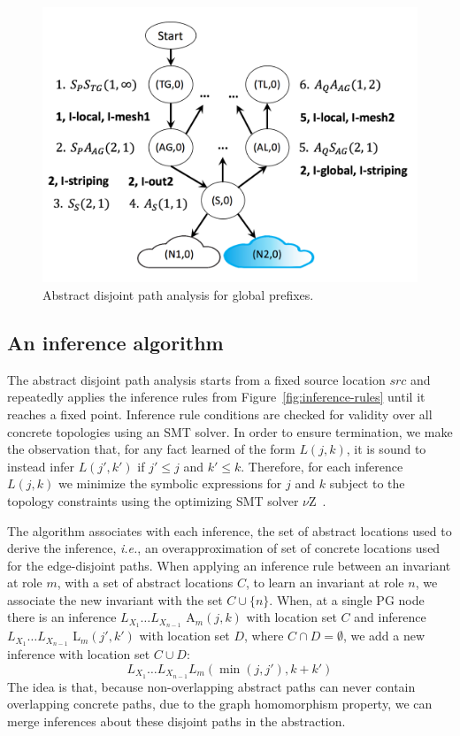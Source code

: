 \documentclass[numbers, 10pt, preprint]{sigplanconf}
\newcommand{\IE}{\emph{i.e.}}
\begin{document}
\begin{figure}
  \begin{center}
    \includegraphics[width=\columnwidth]{figures/analysis}
  \end{center}
  \vspace{-1.4em}
  \caption{Abstract disjoint path analysis for global prefixes. \label{fig:compilation-times}}
  \label{fig:example-inference}
  \vspace{0em}
\end{figure}

\subsection{An inference algorithm}

The abstract disjoint path analysis starts from a fixed source location $src$ and repeatedly applies the inference rules from Figure~\ref{fig:inference-rules} until it reaches a fixed point. Inference rule conditions are checked for validity over all concrete topologies using an SMT solver. In order to ensure termination, we make the observation that, for any fact learned of the form $L(j,k)$, it is sound to instead infer $L(j',k')$ if $j' \leq j$ and $k' \leq k$. Therefore, for each inference $L(j,k)$ we minimize the symbolic expressions for $j$ and $k$ subject to the topology constraints using the optimizing SMT solver $\nu$Z~\cite{z3opt}.

The algorithm associates with each inference, the set of abstract locations used to derive the inference, \IE, an overapproximation of set of concrete locations used for the edge-disjoint paths. When applying an inference rule between an invariant at role $m$, with a set of abstract locations $C$, to learn an invariant at role $n$, we associate the new invariant with the set $C \cup \{ n \}$.
%
When, at a single PG node there is an inference $L_{X_1} \dots L_{X_{n-1}}$ A$_m(j,k)$ with location set $C$ and inference $L_{X_1} \dots L_{X_{n-1}}$ L$_m(j',k')$ with location set $D$, where $C \cap D = \emptyset$, we add a new inference with location set $C \cup D$:
%
$$L_{X_1} \dots L_{X_{n-1}} L_m(\min(j, j'), k + k')$$
%
\noindent
The idea is that, because non-overlapping abstract paths can never contain overlapping concrete paths, due to the graph homomorphism property, we can merge inferences about these disjoint paths in the abstraction.
\end{document}
